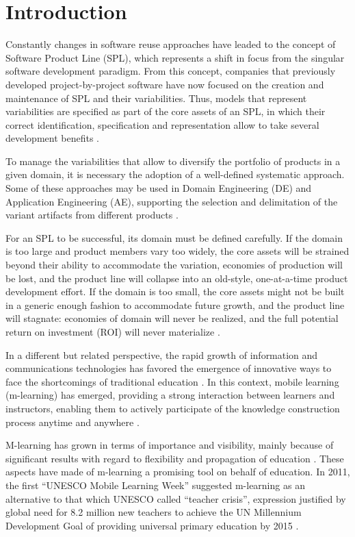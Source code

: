 \section{Introduction}

Constantly changes in software reuse approaches have leaded to the concept of Software Product Line (SPL), which represents a shift in focus from the singular software development paradigm. From this concept, companies that previously developed project-by-project software have now focused on the creation and maintenance of SPL and their variabilities. Thus, models that represent variabilities are specified as part of the core assets of an SPL, in which their correct identification, specification and representation allow to take several development benefits \cite{chen11, capilla13}.

To manage the variabilities that allow to diversify the portfolio of products in a given domain, it is necessary the adoption of a well-defined systematic approach. Some of these approaches may be used in Domain Engineering (DE) and Application Engineering (AE), supporting the selection and delimitation of the variant artifacts from different products \cite{bockle05, vanderlinden07}.

For an SPL to be successful, its domain must be defined carefully. If the domain is too large and product members vary too widely, the core assets will be strained beyond their ability to accommodate the variation, economies of production will be lost, and the product line will collapse into an old-style, one-at-a-time product development effort. If the domain is too small, the core assets might not be built in a generic enough fashion to accommodate future growth, and the product line will stagnate: economies of domain will never be realized, and the full potential return on investment (ROI) will never materialize \cite{bockle05, vanderlinden07}.

In a different but related perspective, the rapid growth of information and communications technologies has favored the emergence of innovative ways to face the shortcomings of traditional education \cite{west12}. In this context, mobile learning (m-learning) has emerged, providing a strong interaction between learners and instructors, enabling them to actively participate of the knowledge construction process anytime and anywhere \cite{kukulska05}. 

M-learning has grown in terms of importance and visibility, mainly because of significant results with regard to flexibility and propagation of education \cite{kinshuk03, wexler08}. These aspects have made of m-learning a promising tool on behalf of education. In 2011, the first ``UNESCO Mobile Learning Week'' suggested m-learning as an alternative to that which UNESCO called ``teacher crisis'', expression justified by global need for 8.2 million new teachers to achieve the UN Millennium Development Goal of providing universal primary education by 2015 \cite{west12}.

